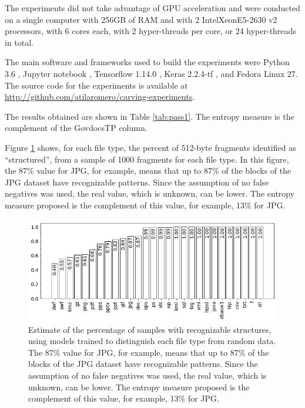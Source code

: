 The experiments did not take advantage of GPU acceleration and were  conducted on a single computer with 256GB of RAM and with 2 Intel\textregistered Xeon\textregistered E5-2630 v2 processors, with 6 cores each, with 2 hyper-threads per core, or 24 hyper-threads in total. 


The main software and frameworks used to build the experiments were Python 3.6 \cite{rossum_python_2019}, Jupyter notebook \cite{perez_jupyter_2019}, Tensorflow 1.14.0 \cite{google_brain_tensorflow_2019}, Keras 2.2.4-tf \cite{chollet_keras_2019}, and Fedora Linux 27.
The source code for the experiments is available at \sloppy\url{http://github.com/atilaromero/carving-experiments}.




The results obtained are shown in Table \ref{tab:pass1}. The entropy measure is the complement of the GovdocsTP column.

Figure \ref{fig:not_random} shows, for each file type, the percent of 512-byte fragments identified as ``structured'', from a sample of 1000 fragments for each file type. In this figure, the 87\% value for JPG, for example, means that up to 87\% of the blocks of the JPG dataset have recognizable patterns. Since the assumption of no false negatives was used, the real value, which is unknown, can be lower. The entropy measure proposed is the complement of this value, for example, 13\% for JPG.

\noindent
\begin{figure}[htb!]
\centering\includegraphics[width=1.0\textwidth]{content/random.png}
\caption[Complement of entropy measure for 28 file types]{\label{fig:not_random}Estimate of the percentage of samples with recognizable structures, using models trained to distinguish each file type from random data. The 87\% value for JPG, for example, means that up to 87\% of the blocks of the JPG dataset have recognizable patterns. Since the assumption of no false negatives was used, the real value, which is unknown, can be lower. The entropy measure proposed is the complement of this value, for example, 13\% for JPG.}%
\end{figure}
